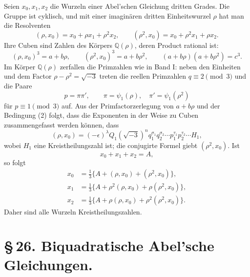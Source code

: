 \documentclass[11pt]{article}
\begin{document}
Seien $x_0,x_1,x_2$ die Wurzeln einer Abel'schen Gleichung dritten Grades. Die Gruppe ist cyklisch, und mit einer imaginären dritten Einheitswurzel $\rho$ hat man die Resolventen
\begin{equation}
  (\rho,x_0)=x_0+\rho x_1+\rho^2x_2,
  \qquad
  (\rho^2,x_0)=x_0+\rho^2x_1+\rho x_2.
  \tag{1}
\end{equation}
Ihre Cuben sind Zahlen des Körpers $\mathbb Q(\rho)$, deren Product rational ist:
\begin{equation}
   (\rho,x_0)^3=a+b\rho,
   \qquad
   (\rho^2,x_0)^3=a+b\rho^2,
   \qquad
   (a+b\rho)(a+b\rho^2)=c^3 .
   \tag{2}
\end{equation}
Im Körper $\mathbb Q(\rho)$ zerfallen die Primzahlen wie in Band I: neben den Einheiten und dem Factor $\rho-\rho^2=\sqrt{-3}$ treten die reellen Primzahlen $q\equiv2\pmod3$ und die Paare
\begin{equation}
   p=\pi\pi',
   \qquad
   \pi=\psi_1(\rho),
   \quad
   \pi'=\psi_1(\rho^2)
   \tag{3}
\end{equation}
für $p\equiv1\pmod3$ auf. Aus der Primfactorzerlegung von $a+b\rho$ und der Bedingung (2) folgt, dass die Exponenten in der Weise zu Cuben zusammengefasst werden können, dass
\begin{equation}
   (\rho,x_0)=(-\epsilon)^\lambda Q_1
   (\sqrt{-3})^n q_1^{\sigma_1}q_2^{\sigma_2}\cdots
   p_1^{\tau_1}p_2^{\tau_2}\cdots H_1,
   \tag{4}
\end{equation}
wobei $H_1$ eine Kreistheilungszahl ist; die conjugirte Formel giebt $(\rho^2,x_0)$. Ist
\begin{equation}
   x_0+x_1+x_2=A,
   \tag{5}
\end{equation}
so folgt
\begin{equation}
\begin{aligned}
 x_0&=\frac13\{A+(\rho,x_0)+(\rho^2,x_0)\},\\
 x_1&=\frac13\{A+\rho^2(\rho,x_0)+\rho(\rho^2,x_0)\},\\
 x_2&=\frac13\{A+\rho(\rho,x_0)+\rho^2(\rho^2,x_0)\}.
\end{aligned}
\tag{6}
\end{equation}
Daher sind alle Wurzeln Kreistheilungszahlen.

\section*{\S\,26. Biquadratische Abel'sche Gleichungen.}
\end{document}
